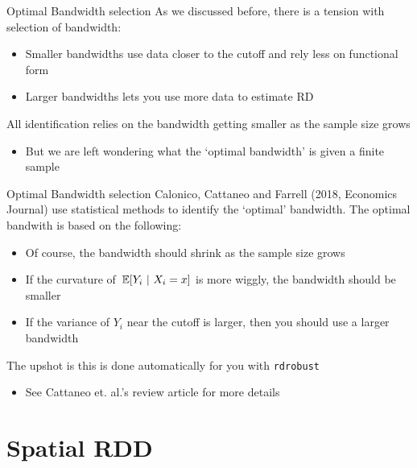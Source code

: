 \documentclass[aspectratio=169,t,11pt,table]{beamer}
\begin{document}
\begin{frame}{Optimal Bandwidth selection}
  As we discussed before, there is a tension with selection of bandwidth:
  \begin{itemize}
    \item Smaller bandwidths use data closer to the cutoff and rely less on functional form
    
    \item Larger bandwidths lets you use more data to estimate RD
  \end{itemize}

  \bigskip
  All identification relies on the bandwidth getting smaller as the sample size grows
  \begin{itemize}
    \item But we are left wondering what the `optimal bandwidth' is given a finite sample
  \end{itemize}
\end{frame}


\begin{frame}{Optimal Bandwidth selection}
  Calonico, Cattaneo and Farrell (2018, Economics Journal) use statistical methods to identify the `optimal' bandwidth. The optimal bandwith is based on the following:
  \begin{itemize}
    \item Of course, the bandwidth should shrink as the sample size grows

    \item If the curvature of $\expec{Y_i}{X_i = x}$ is more wiggly, the bandwidth should be smaller

    \item If the variance of $Y_i$ near the cutoff is larger, then you should use a larger bandwidth
  \end{itemize}

  \pause
  \bigskip 
  The upshot is this is done automatically for you with \texttt{rdrobust}
  \begin{itemize}
    \item See Cattaneo et. al.'s review article for more details
  \end{itemize}
\end{frame}



\section{Spatial RDD}
\end{document}
